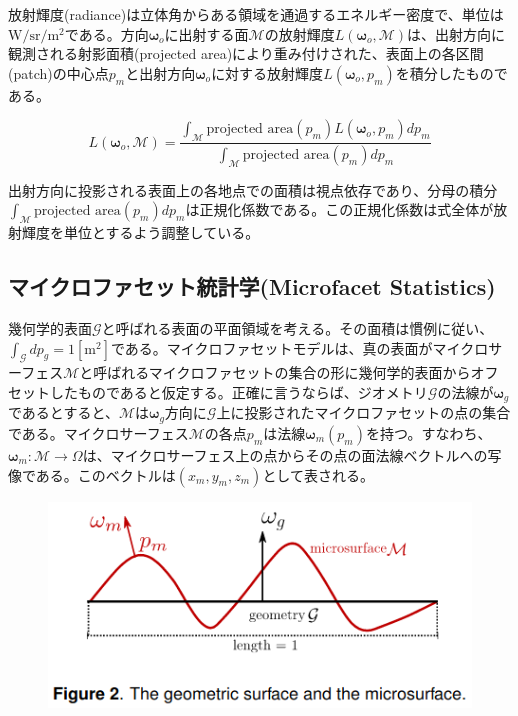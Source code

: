 \documentclass[a4j,xelatex,ja=standard]{bxjsarticle}
\begin{document}
放射輝度(radiance)は立体角からある領域を通過するエネルギー密度で、単位は$\text{W}/\text{sr}/\text{m}^2$である。方向$\boldsymbol{\omega}_o$に出射する面$\mathcal M$の放射輝度$L(\boldsymbol{\omega}_o, \mathcal{M})$は、出射方向に観測される射影面積(projected area)により重み付けされた、表面上の各区間(patch)の中心点$p_m$と出射方向$\boldsymbol{\omega}_o$に対する放射輝度$L(\boldsymbol{\omega}_o, p_m)$を積分したものである。

\begin{equation}
    L(\boldsymbol{\omega}_o, \mathcal{M}) = \frac{\int_{\mathcal M} \text{projected area}(p_m) L(\boldsymbol{\omega}_o, p_m) dp_m}{\int_{\mathcal M} \text{projected area}(p_m) dp_m}
    \label{eq:1}
\end{equation}

出射方向に投影される表面上の各地点での面積は視点依存であり、分母の積分$\int_{\mathcal M} \text{projected area}(p_m) dp_m$は正規化係数である。この正規化係数は式全体が放射輝度を単位とするよう調整している。

\subsection{マイクロファセット統計学(Microfacet Statistics)}

幾何学的表面$\mathcal G$と呼ばれる表面の平面領域を考える。その面積は慣例に従い、$\int_{\mathcal G}dp_g = 1 [\text{m}^2]$である。マイクロファセットモデルは、真の表面がマイクロサーフェス$\mathcal M$と呼ばれるマイクロファセットの集合の形に幾何学的表面からオフセットしたものであると仮定する。正確に言うならば、ジオメトリ$\mathcal G$の法線が$\boldsymbol{\omega}_g$であるとすると、$\mathcal M$は$\boldsymbol{\omega}_g$方向に$\mathcal G$上に投影されたマイクロファセットの点の集合である。マイクロサーフェス$\mathcal M$の各点$p_m$は法線$\boldsymbol{\omega}_m(p_m)$を持つ。すなわち、$\boldsymbol{\omega}_m : \mathcal{M} \rightarrow \Omega$は、マイクロサーフェス上の点からその点の面法線ベクトルへの写像である。このベクトルは$(x_m, y_m, z_m)$として表される。

\begin{figure}
    \includegraphics[width=\textwidth]{Figure2.png}
    \caption{}
    \label{fig:2}
\end{figure}
\end{document}
